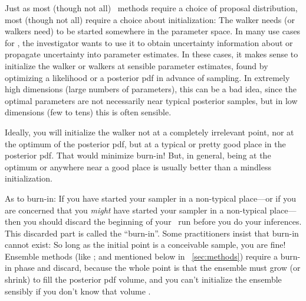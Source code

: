 \documentclass[12pt,twoside,pdftex]{article}
\newcommand{\MCMC}{\acronym{MCMC}}
\begin{document}
Just as most (though not all) \MCMC\ methods require a choice of
proposal distribution, most (though not all) require a choice about
initialization:
The walker needs (or walkers need) to be started somewhere in the
parameter space.
In many use cases for \MCMC, the investigator wants to use it to obtain
uncertainty information about or propagate uncertainty into parameter
estimates.
In these cases, it makes sense to initialize the walker or walkers at
sensible parameter estimates, found by optimizing a likelihood or a
posterior pdf in advance of sampling.
In extremely high dimensions (large numbers of parameters), this can
be a bad idea, since the optimal parameters are not necessarily near
typical posterior samples, but
in low dimensions (few to tens) this is often sensible.

Ideally, you will initialize the walker not at a completely irrelevant
point, nor at the optimum of the posterior pdf, but at a typical or
pretty good place in the posterior pdf.
That would minimize burn-in!
But, in general, being at the optimum or anywhere near a good place is
usually better than a mindless initialization.

As to burn-in:
If you have started your sampler in a non-typical place---or if you
are concerned that you \emph{might} have started your sampler in a
non-typical place---then you should discard the beginning of your
\MCMC\ run before you do your inferences.
This discarded part is called the ``burn-in''.
Some practitioners insist that burn-in cannot exist: So long as the initial point is a conceivable
sample, you are fine!
Ensemble methods (like ; and
mentioned below in \sectionname~\ref{sec:methods}) require a burn-in
phase and discard, because the whole point is that the ensemble must
grow (or shrink) to fill the posterior pdf volume, and you can't
initialize the ensemble sensibly if you don't know that volume
.
\end{document}
